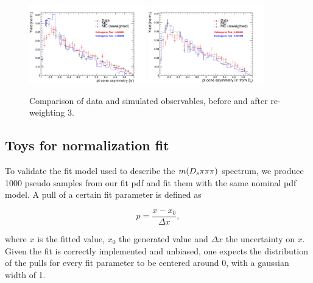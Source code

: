 \begin{figure}[h!]
\includegraphics[height=6.cm,width=0.45\textwidth]{figs/MC-v-Data/pi_minus_ptasy_1_00.pdf}
\includegraphics[height=6.cm,width=0.45\textwidth]{figs/MC-v-Data/pi_minus_fromDs_ptasy_1_00.pdf}
\caption{Comparison of data and simulated observables, before and after re-weighting 3.}
\end{figure}

\subsection{Toys for normalization fit}
\label{sec: toysNorm}

To validate the fit model used to describe the $m({{D}_{s}}{\pi}{\pi}{\pi})$ spectrum, we produce 1000 pseudo samples from our fit pdf and fit them with the same nominal pdf model. \newline
A pull of a certain fit parameter is defined as

\begin{equation}
p = \frac{x - x_{0}}{\Delta x},
\label{eq: pull}
\end{equation}  

where $x$ is the fitted value, $x_{0}$ the generated value and $\Delta x$ the uncertainty on $x$. 
Given the fit is correctly implemented and unbiased, one expects the distribution of the pulls for every fit parameter to be centered around 0, with a gaussian width of 1.





\FloatBarrier
